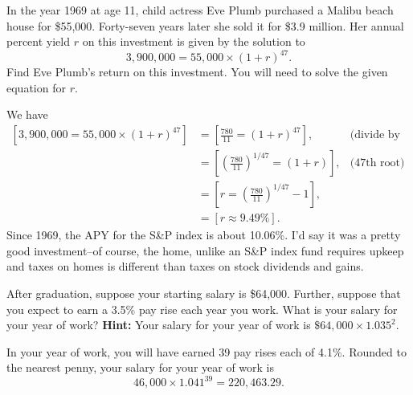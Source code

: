 \documentclass[12pt, answers,fleqn]{exam}
\begin{document}
\begin{questions}
\question  In the year 1969 at age 11, child actress Eve Plumb purchased a Malibu beach house for \$55,000. Forty-seven years
later she sold it for \$3.9 million. Her annual percent yield $r$ on this investment is given by the solution to
\[
       3, 900,000 = 55,000 \times (1 + r)^{47}.
\]
Find Eve Plumb's return on this investment. You will need to solve the given equation for $r$.
    \begin{solution}%
        We have
        \begin{align*}
            \left [3, 900,000 = 55,000 \times (1 + r)^{47} \right] &= 
           \left [\frac{780}{11} = (1 + r)^{47} \right] , &\mbox{(divide by 55000)}\\
            &= \left [\left(\frac{780}{11}\right)^{1/47} = (1 + r) \right] , &\mbox{(47th root)}\\
            &= \left [r = \left(\frac{780}{11} \right)^{1/47} - 1 \right], \\
            &= \left [r \approx 9.49\% \right ].
        \end{align*}
    Since 1969, the APY for the S\&P index is about 10.06\%. I'd
    say it was a pretty good investment--of course, the home, unlike
    an S\&P index fund requires upkeep and taxes on homes is different
    than taxes on stock dividends and gains.
    \end{solution}
    \question   After graduation, suppose your starting salary is \$64,000. Further, suppose
that you expect to earn a 3.5\% pay rise each year you work. What is your salary for 
your  year of work?  \textbf{Hint:} Your salary for your  year of work
is $\$64,000 \times 1.035^2$.
\begin{solution}%
In your  year of work, you will have earned 39 pay rises each of 4.1\%. Rounded to 
the nearest penny, your salary for your  year of work is
\begin{equation*}
   46,000 \times 1.041^{39} = 220,463.29.
 \end{equation*}   
\end{solution}


\end{questions}
\end{document}
